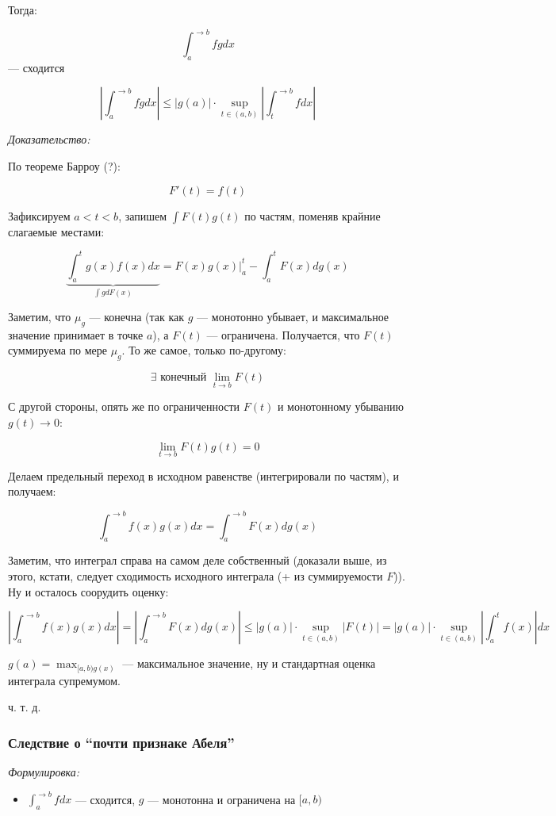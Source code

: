 \documentclass{article}
\begin{document}
Тогда:

\[\int_{a}^{\rightarrow b} fg dx\] --- сходится

\[\left|\int_{a}^{\rightarrow b} fg dx\right| \le |g(a)| \cdot \sup_{t \in (a, b)} \left|\int_{t}^{\rightarrow b} f dx\right|\]

\textit{Доказательство:}

По теореме Барроу (?):

\[F'(t) = f(t)\]

Зафиксируем $a < t < b$, запишем $\int F(t)g(t)$ по частям, поменяв крайние слагаемые местами:

\[\underbrace{\int_a^t g(x) f(x)dx}_{\int g dF(x)} = F(x)g(x)|_a^t - \int_a^t F(x) dg(x)\]

Заметим, что $\mu_g$ --- конечна (так как $g$ --- монотонно убывает, и максимальное значение принимает в точке $a$),  а $F(t)$ --- ограничена. Получается, что $F(t)$ суммируема по мере $\mu_g$. То же самое, только по-другому:

\[\exists \text{ конечный }\lim_{t \rightarrow b} F(t)\]

С другой стороны, опять же по ограниченности $F(t)$ и монотонному убыванию $g(t) \rightarrow 0$:

\[\lim_{t \rightarrow b} F(t)g(t) = 0\]

Делаем предельный переход в исходном равенстве (интегрировали по частям), и получаем:

\[\int_a^{\rightarrow b} f(x)g(x) dx = \int_a^{\rightarrow b} F(x)dg(x)\]

Заметим, что интеграл справа на самом деле собственный (доказали выше, из этого, кстати, следует сходимость исходного интеграла (+ из суммируемости $F$)). Ну и осталось соорудить оценку:

\[\left|\int_a^{\rightarrow b} f(x)g(x) dx\right| = \left|\int_a^{\rightarrow b} F(x)dg(x)\right| \le |g(a)| \cdot \sup_{t \in (a, b)}|F(t)| = |g(a)| \cdot \sup_{t \in (a, b)} \left|\int_a^t f(x)\right| dx\]

$g(a) = \max_{[a, b) g(x)}$ --- максимальное значение, ну и стандартная оценка интеграла супремумом.

ч. т. д. 

\subsubsection{Следствие о ``почти признаке Абеля''}
\textit{Формулировка:}

\begin{itemize}
    \item $\int_{a}^{\rightarrow b} f dx$ --- сходится, $g$ --- монотонна и ограничена на $[a, b)$
\end{itemize}
\end{document}
